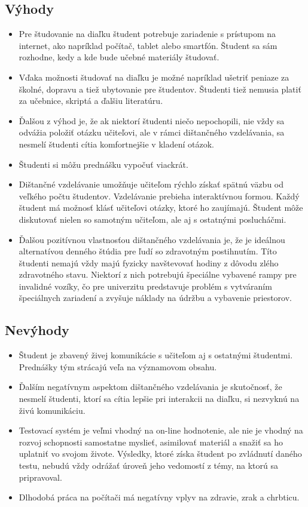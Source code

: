 \documentclass[10pt,oneside,slovak,a4paper]{article}
\begin{document}
\subsection{Výhody}
\begin{itemize}
	\item Pre študovanie na diaľku študent potrebuje zariadenie s prístupom na internet, ako napríklad počítač, tablet alebo smartfón. Študent sa sám rozhodne, kedy a kde bude učebné materiály študovať.
	\item Vďaka možnosti študovať na diaľku je možné napríklad ušetriť peniaze za školné, dopravu a tiež ubytovanie pre študentov. Študenti tiež nemusia platiť za učebnice, skriptá a ďalšiu literatúru.
	\item Ďalšou z výhod je, že ak niektorí študenti niečo nepochopili, nie vždy sa odvážia položiť otázku učiteľovi, ale v rámci dištančného vzdelávania, sa nesmelí študenti cítia komfortnejšie v kladení otázok. 
	\item Študenti si môžu prednášku vypočuť viackrát.%
	\item Dištančné vzdelávanie umožňuje učiteľom rýchlo získať spätnú väzbu od veľkého počtu študentov. Vzdelávanie prebieha interaktívnou formou. Každý študent má možnosť klásť učiteľovi otázky, ktoré ho zaujímajú. Študent môže diskutovať nielen so samotným učiteľom, ale aj s ostatnými poslucháčmi.
	\item Ďalšou pozitívnou vlastnosťou dištančného vzdelávania je, že je ideálnou alternatívou denného štúdia pre ľudí so zdravotným postihnutím. Títo študenti nemajú vždy majú fyzicky navštevovať hodiny z dôvodu zlého zdravotného stavu. Niektorí z nich potrebujú špeciálne vybavené rampy pre invalidné vozíky, čo pre univerzitu predstavuje problém s vytváraním špeciálnych zariadení a zvyšuje náklady na údržbu a vybavenie priestorov.
\end{itemize}
\subsection{Nevýhody}
\begin{itemize}
	\item Študent je zbavený živej komunikácie s učiteľom aj s ostatnými študentmi. Prednášky tým strácajú veľa na významovom obsahu.
	\item Ďalším negatívnym aspektom dištančného vzdelávania je skutočnosť, že nesmelí študenti, ktorí sa cítia lepšie pri interakcii na diaľku, si nezvyknú na živú komunikáciu.
	\item Testovací systém je veľmi vhodný na on-line hodnotenie, ale nie je vhodný na rozvoj schopnosti samostatne myslieť, asimilovať materiál a snažiť sa ho uplatniť vo svojom živote. Výsledky, ktoré získa študent po zvládnutí daného testu, nebudú vždy odrážať úroveň jeho vedomostí z témy, na ktorú sa pripravoval.
	\item Dlhodobá práca na počítači má negatívny vplyv na zdravie, zrak a chrbticu.
\end{itemize}
\end{document}
